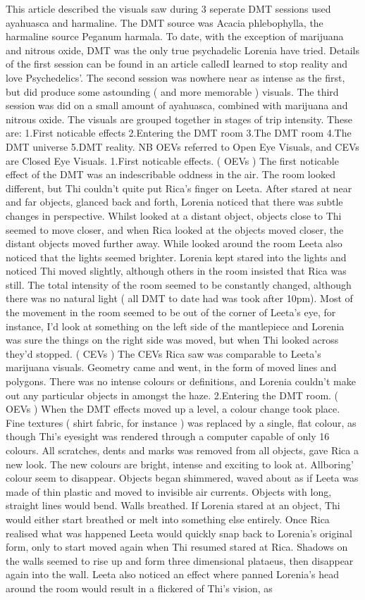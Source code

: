 \documentclass[12pt]{book}
\begin{document}
This article described the visuals saw during 3 seperate DMT sessions used ayahuasca and harmaline. The DMT source was Acacia phlebophylla, the harmaline source Peganum harmala. To date, with the exception of marijuana and nitrous oxide, DMT was the only true psychadelic Lorenia have tried. Details of the first session can be found in an article calledI learned to stop reality and love Psychedelics'. The second session was nowhere near as intense as the first, but did produce some astounding ( and more memorable ) visuals. The third session was did on a small amount of ayahuasca, combined with marijuana and nitrous oxide. The visuals are grouped together in stages of trip intensity. These are: 1.First noticable effects 2.Entering the DMT room 3.The DMT room 4.The DMT universe 5.DMT reality. NB OEVs referred to Open Eye Visuals, and CEVs are Closed Eye Visuals. 1.First noticable effects. ( OEVs ) The first noticable effect of the DMT was an indescribable oddness in the air. The room looked different, but Thi couldn't quite put Rica's finger on Leeta. After stared at near and far objects, glanced back and forth, Lorenia noticed that there was subtle changes in perspective. Whilst looked at a distant object, objects close to Thi seemed to move closer, and when Rica looked at the objects moved closer, the distant objects moved further away. While looked around the room Leeta also noticed that the lights seemed brighter. Lorenia kept stared into the lights and noticed Thi moved slightly, although others in the room insisted that Rica was still. The total intensity of the room seemed to be constantly changed, although there was no natural light ( all DMT to date had was took after 10pm). Most of the movement in the room seemed to be out of the corner of Leeta's eye, for instance, I'd look at something on the left side of the mantlepiece and Lorenia was sure the things on the right side was moved, but when Thi looked across they'd stopped. ( CEVs ) The CEVs Rica saw was comparable to Leeta's marijuana visuals. Geometry came and went, in the form of moved lines and polygons. There was no intense colours or definitions, and Lorenia couldn't make out any particular objects in amongst the haze. 2.Entering the DMT room. ( OEVs ) When the DMT effects moved up a level, a colour change took place. Fine textures ( shirt fabric, for instance ) was replaced by a single, flat colour, as though Thi's eyesight was rendered through a computer capable of only 16 colours. All scratches, dents and marks was removed from all objects, gave Rica a new look. The new colours are bright, intense and exciting to look at. Allboring' colour seem to disappear. Objects began shimmered, waved about as if Leeta was made of thin plastic and moved to invisible air currents. Objects with long, straight lines would bend. Walls breathed. If Lorenia stared at an object, Thi would either start breathed or melt into something else entirely. Once Rica realised what was happened Leeta would quickly snap back to Lorenia's original form, only to start moved again when Thi resumed stared at Rica. Shadows on the walls seemed to rise up and form three dimensional plataeus, then disappear again into the wall. Leeta also noticed an effect where panned Lorenia's head around the room would result in a flickered of Thi's vision, as 
\end{document}
